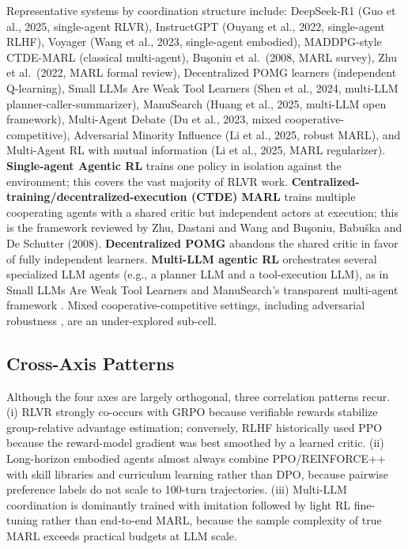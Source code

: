\documentclass{article}
\begin{document}
Representative systems by coordination structure include: DeepSeek-R1 (Guo et al., 2025, single-agent RLVR), InstructGPT (Ouyang et al., 2022, single-agent RLHF), Voyager (Wang et al., 2023, single-agent embodied), MADDPG-style CTDE-MARL (classical multi-agent), Buşoniu et al.~(2008, MARL survey), Zhu et al.~(2022, MARL formal review), Decentralized POMG learners (independent Q-learning), Small LLMs Are Weak Tool Learners (Shen et al., 2024, multi-LLM planner-caller-summarizer), ManuSearch (Huang et al., 2025, multi-LLM open framework), Multi-Agent Debate (Du et al., 2023, mixed cooperative-competitive), Adversarial Minority Influence (Li et al., 2025, robust MARL), and Multi-Agent RL with mutual information (Li et al., 2025, MARL regularizer). \textbf{Single-agent Agentic RL} trains one policy in isolation against the environment; this covers the vast majority of RLVR work. \textbf{Centralized-training/decentralized-execution (CTDE) MARL} trains multiple cooperating agents with a shared critic but independent actors at execution; this is the framework reviewed by Zhu, Dastani and Wang \citet{wang20232023} and Buşoniu, Babuška and De Schutter (2008). \textbf{Decentralized POMG} abandons the shared critic in favor of fully independent learners. \textbf{Multi-LLM agentic RL} orchestrates several specialized LLM agents (e.g., a planner LLM and a tool-execution LLM), as in Small LLMs Are Weak Tool Learners \citep{shen20242024} and ManuSearch's transparent multi-agent framework \citep{huang20252025}. Mixed cooperative-competitive settings, including adversarial robustness \citep{li2025aplanreusemechanis}, are an under-explored sub-cell.

\subsection{Cross-Axis Patterns}\label{cross-axis-patterns}

Although the four axes are largely orthogonal, three correlation patterns recur. (i) RLVR strongly co-occurs with GRPO because verifiable rewards stabilize group-relative advantage estimation; conversely, RLHF historically used PPO because the reward-model gradient was best smoothed by a learned critic. (ii) Long-horizon embodied agents almost always combine PPO/REINFORCE++ with skill libraries and curriculum learning rather than DPO, because pairwise preference labels do not scale to 100-turn trajectories. (iii) Multi-LLM coordination is dominantly trained with imitation followed by light RL fine-tuning rather than end-to-end MARL, because the sample complexity of true MARL exceeds practical budgets at LLM scale.
\end{document}
